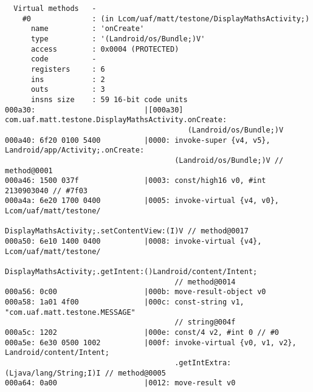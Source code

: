 \begin{lstlisting}
  Virtual methods   -
    #0              : (in Lcom/uaf/matt/testone/DisplayMathsActivity;)
      name          : 'onCreate'
      type          : '(Landroid/os/Bundle;)V'
      access        : 0x0004 (PROTECTED)
      code          -
      registers     : 6
      ins           : 2
      outs          : 3
      insns size    : 59 16-bit code units
000a30:                         |[000a30] com.uaf.matt.testone.DisplayMathsActivity.onCreate:
                                          (Landroid/os/Bundle;)V
000a40: 6f20 0100 5400          |0000: invoke-super {v4, v5}, Landroid/app/Activity;.onCreate:
                                       (Landroid/os/Bundle;)V // method@0001
000a46: 1500 037f               |0003: const/high16 v0, #int 2130903040 // #7f03
000a4a: 6e20 1700 0400          |0005: invoke-virtual {v4, v0}, Lcom/uaf/matt/testone/
                                       DisplayMathsActivity;.setContentView:(I)V // method@0017
000a50: 6e10 1400 0400          |0008: invoke-virtual {v4}, Lcom/uaf/matt/testone/
                                       DisplayMathsActivity;.getIntent:()Landroid/content/Intent;
                                       // method@0014
000a56: 0c00                    |000b: move-result-object v0
000a58: 1a01 4f00               |000c: const-string v1, "com.uaf.matt.testone.MESSAGE"
                                       // string@004f
000a5c: 1202                    |000e: const/4 v2, #int 0 // #0
000a5e: 6e30 0500 1002          |000f: invoke-virtual {v0, v1, v2}, Landroid/content/Intent;
                                       .getIntExtra:(Ljava/lang/String;I)I // method@0005
000a64: 0a00                    |0012: move-result v0





\end{lstlisting}
